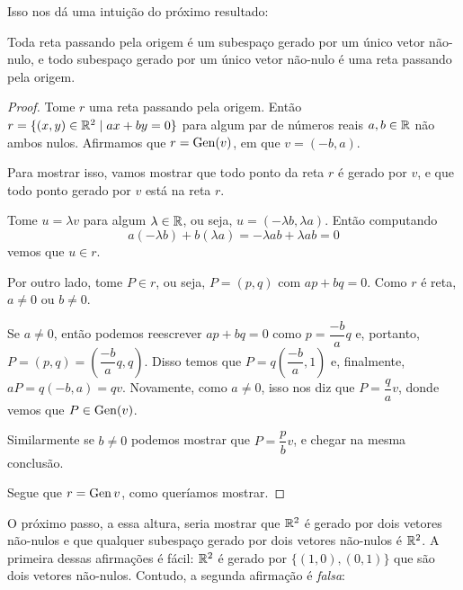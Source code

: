 Isso nos dá uma intuição do próximo resultado:
\begin{prop}
	Toda reta passando pela origem é um subespaço gerado por um único vetor não-nulo, e todo subespaço gerado por um único vetor não-nulo é uma reta passando pela origem.
\end{prop}
\begin{proof}
	Tome $r$ uma reta passando pela origem. Então $r=\{(x,y)\in\mathbb R^2\mid ax+by=0\}$ para algum par de números reais $a,b\in \mathbb R$ não ambos nulos. Afirmamos que $r=\operatorname{Gen}(v)$, em que $v=(-b,a)$.
	
	Para mostrar isso, vamos mostrar que todo ponto da reta $r$ é gerado por $v$, e que todo ponto gerado por $v$ está na reta $r$.
	
	Tome $u=\lambda v$ para algum $\lambda\in \mathbb R$, ou seja, $u=(-\lambda b,\lambda a)$. Então computando
	\[a(-\lambda b)+b(\lambda a)=-\lambda a b+\lambda ab=0\]vemos que $u\in r$.
	
	Por outro lado, tome $P\in r$, ou seja, $P=(p,q)$ com $ap+bq=0$. Como $r$ é reta, $a\neq0$ ou $b\neq 0$.
	
	Se $a\neq0$, então podemos reescrever $ap+bq=0$ como $p=\dfrac{-b}{a}q$ e, portanto, $P=(p,q)=\left(\dfrac{-b}{a}q,q\right)$. Disso temos que \(P=q\left(\dfrac{-b}{a},1\right)\) e, finalmente, $aP=q(-b,a)=qv$. Novamente, como $a\neq 0$, isso nos diz que $P=\dfrac{q}{a}v$, donde vemos que $P\in \operatorname{Gen}(v)$.
	
	Similarmente se $b\neq 0$ podemos mostrar que $P=\dfrac{p}{b}v$, e chegar na mesma conclusão.
	
	Segue que $r=\operatorname{Gen} v$, como queríamos mostrar.
\end{proof}

O próximo passo, a essa altura, seria mostrar que $\mathbb R^2$ é gerado por dois vetores não-nulos e que qualquer subespaço gerado por dois vetores não-nulos é $\mathbb R^2$. A primeira dessas afirmações é fácil: $\mathbb R^2$ é gerado por $\{(1,0),(0,1)\}$ que são dois vetores não-nulos. Contudo, a segunda afirmação é \textit{falsa}:

